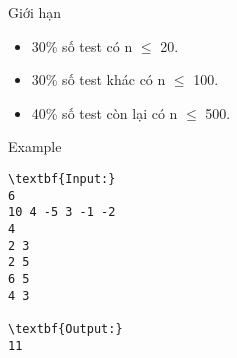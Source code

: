 Giới hạn
\begin{itemize}
	\item 30\% số test có n  $\le$  20.
	\item 30\% số test khác có n  $\le$  100.
	\item 40\% số test còn lại có n  $\le$  500.
\end{itemize}
Example
\begin{verbatim}
\textbf{Input:}
6
10 4 -5 3 -1 -2
4
2 3
2 5
6 5
4 3

\textbf{Output:}
11
\end{verbatim}